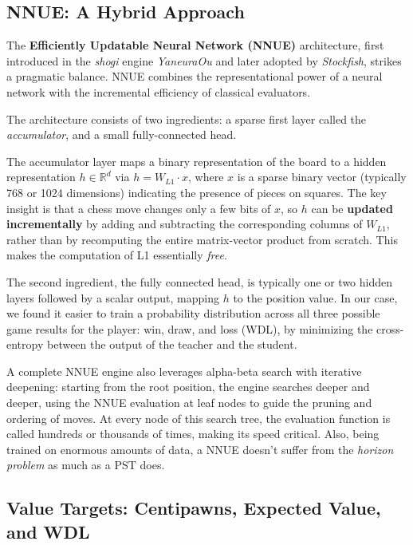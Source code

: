 \subsection{NNUE: A Hybrid Approach}

The \textbf{Efficiently Updatable Neural Network (NNUE)} architecture, first introduced in the \emph{shogi} engine \emph{YaneuraOu} and later adopted by \emph{Stockfish}, strikes a pragmatic balance. NNUE combines the representational power of a neural network with the incremental efficiency of classical evaluators.

The architecture consists of two ingredients: a sparse first layer called the \emph{accumulator}, and a small fully-connected head.

The accumulator layer maps a binary representation of the board to a hidden representation $h \in \mathbb{R}^{d}$ via $h = W_{L1} \cdot x$, where $x$ is a sparse binary vector (typically 768 or 1024 dimensions) indicating the presence of pieces on squares. The key insight is that a chess move changes only a few bits of $x$, so $h$ can be \textbf{updated incrementally} by adding and subtracting the corresponding columns of $W_{L1}$, rather than by recomputing the entire matrix-vector product from scratch. This makes the computation of L1 essentially \emph{free}.

The second ingredient, the fully connected head, is typically one or two hidden layers followed by a scalar output, mapping $h$ to the position value. In our case, we found it easier to train a probability distribution across all three possible game results for the player: win, draw, and loss (WDL), by minimizing the cross-entropy between the output of the teacher and the student.

A complete NNUE engine also leverages alpha-beta search with iterative deepening: starting from the root position, the engine searches deeper and deeper, using the NNUE evaluation at leaf nodes to guide the pruning and ordering of moves. At every node of this search tree, the evaluation function is called hundreds or thousands of times, making its speed critical. Also, being trained on enormous amounts of data, a NNUE doesn't suffer from the \emph{horizon problem} as much as a PST does.


\subsection{Value Targets: Centipawns, Expected Value, and WDL}

